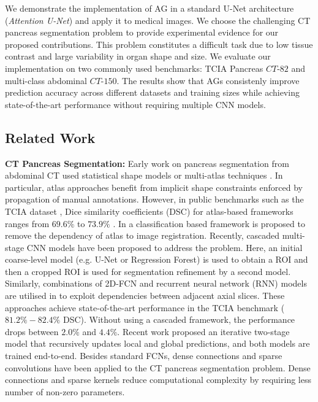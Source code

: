 \documentclass{article}
\begin{document}
We demonstrate the implementation of AG in a standard U-Net architecture (\emph{Attention U-Net}) and apply it to medical images. We choose the challenging CT pancreas segmentation problem to provide experimental evidence for our proposed contributions. This problem constitutes a difficult task due to low tissue contrast and large variability in organ shape and size. We evaluate our implementation on two commonly used benchmarks: TCIA Pancreas $CT$-$82$ \cite{tciapancreas} and multi-class abdominal $CT$-$150$. The results show that AGs consistenly improve prediction accuracy across different datasets and training sizes while achieving state-of-the-art performance without requiring multiple CNN models. 

\vspace{-1.0 mm}
\subsection{Related Work}
\textbf{CT Pancreas Segmentation:} Early work on pancreas segmentation from abdominal CT used statistical shape models \cite{cerrolaza2016soft, saito2016joint} or multi-atlas techniques \cite{oda20173d, wolz2013automated}. In particular, atlas approaches benefit from implicit shape constraints enforced by propagation of manual annotations. However, in public benchmarks such as the TCIA dataset \cite{tciapancreas}, Dice similarity coefficients (DSC) for atlas-based frameworks ranges from $69.6\%$ to $73.9\%$ \cite{oda20173d, wolz2013automated}. In \cite{zografos2015hierarchical} a classification based framework is proposed to remove the dependency of atlas to image registration. Recently, cascaded multi-stage CNN models \cite{roth2018media, roth2017hierarchical, zhou2017fixed} have been proposed to address the problem. Here, an initial coarse-level model (e.g. U-Net or Regression Forest) is used to obtain a ROI and then a cropped ROI is used for segmentation refinement by a second model. Similarly, combinations of 2D-FCN and recurrent neural network (RNN) models are utilised in \cite{cai2017improving} to exploit dependencies between adjacent axial slices. These approaches achieve state-of-the-art performance in the TCIA benchmark ($81.2\% - 82.4\%$ DSC). Without using a cascaded framework, the performance drops between $2.0\%$ and $4.4\%$. Recent work \cite{yu2017saliency} proposed an iterative two-stage model that recursively updates local and global predictions, and both models are trained end-to-end. Besides standard FCNs, dense connections \cite{gibson2017towards} and sparse convolutions \cite{heinrich2018ternarynet, heinrich2017briefnet} have been applied to the CT pancreas segmentation problem. Dense connections and sparse kernels reduce computational complexity by requiring less number of non-zero parameters. 
\end{document}
